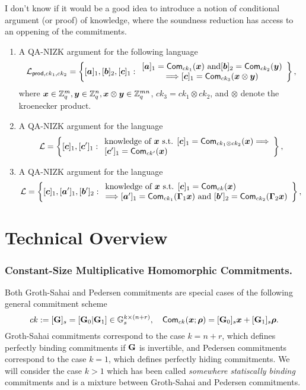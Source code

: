 \begin{enumerate}
{\color{red} I don't know if it would be a good idea to introduce a notion of conditional argument (or proof) of knowledge, where the soundness reduction has access to an oppening of the commitments.}
\begin{enumerate}
\item A QA-NIZK argument for the following language
$$
\mathcal{L}_{\mathsf{prod},ck_1,ck_2}=\left\{[{\boldsymbol{a}}]_1,[{\boldsymbol{b}}]_2,[{\boldsymbol{c}}]_1:
	\begin{array}{c}
		[{\boldsymbol{a}}]_1=\mathsf{Com}_{ck_1}({\boldsymbol{x}})\text{ and}
		{[{\boldsymbol{b}}]_2=\mathsf{Com}_{ck_2}({\boldsymbol{y}})}\\
		\Longrightarrow
		[{\boldsymbol{c}}]_1=\mathsf{Com}_{ck_3}({\boldsymbol{x}}\otimes{\boldsymbol{y}})
	\end{array}\right\},
$$
where ${\boldsymbol{x}}\in\mathbb{Z}_q^m,{\boldsymbol{y}}\in\mathbb{Z}_q^n,{\boldsymbol{x}}\otimes{\boldsymbol{y}}\in\mathbb{Z}_q^{mn}$, $ck_3=ck_1\otimes ck_2$, and $\otimes$ denote the kroenecker product.
\item A QA-NIZK argument for the language
$$
\mathcal{L} = \left\{[{\boldsymbol{c}}]_1,[{\boldsymbol{c}}']_1:
	\begin{array}{l} \text{knowledge of } {\boldsymbol{x}} \text{ s.t. }
		{[{\boldsymbol{c}}]_1=\mathsf{Com}_{ck_1\otimes ck_2}({\boldsymbol{x}})}
		\Longrightarrow\\
		{[{\boldsymbol{c}}']_1=\mathsf{Com}_{ck'}({\boldsymbol{x}})}
	\end{array}\right\},
$$
\item A QA-NIZK argument for the language
$$
\mathcal{L} = \left\{[{\boldsymbol{c}}]_1,[{\boldsymbol{a}}']_1,[{\boldsymbol{b}}']_2:
	\begin{array}{l}
		\text{knowledge of } {\boldsymbol{x}} \text{ s.t. }[{\boldsymbol{c}}]_1=\mathsf{Com}_{ck}({\boldsymbol{x}})\\
		\Longrightarrow
		[{\boldsymbol{a}}']_1=\mathsf{Com}_{ck_1}(\mathbf{{\Gamma}}_1{\boldsymbol{x}})\text{ and }
		[{\boldsymbol{b}}']_2=\mathsf{Com}_{ck_2}(\mathbf{{\Gamma}}_2{\boldsymbol{x}})
	\end{array}\right\},
$$
\end{enumerate}
\end{enumerate}

\section{Technical Overview}

\subsubsection{Constant-Size  Multiplicative Homomorphic Commitments.}
Both Groth-Sahai and Pedersen commitments are special cases of the following general commitment scheme
$$
ck:=[\mathbf{{G}}]_s=[\mathbf{{G}}_0|\mathbf{{G}}_1]\in\mathbb{G}_s^{k\times (n+r)}, \quad \mathsf{Com}_{ck}({\boldsymbol{x}};{\boldsymbol{\rho}})=[\mathbf{{G}}_0]_s{\boldsymbol{x}}+[\mathbf{{G}}_1]_s{\boldsymbol{\rho}}.
$$
Groth-Sahai commitments correspond to the case $k=n+r$, which defines perfectly binding commitments if $\mathbf{{G}}$ is invertible, and Pedersen commitments correspond to the case $k=1$, which defines perfectly hiding commitments. We will consider the case $k>1$ which has been called \emph{somewhere statiscally binding} commitments and is a mixture between Groth-Sahai and Pedersen commitments.

